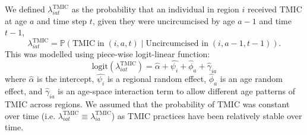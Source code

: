 \documentclass{article}
\begin{document}
\begin{appendix}
\noindent We defined $\lambda^{\text{TMIC}}_{iat}$ as the probability that an individual in region $i$ received TMIC at age $a$ and time step $t$, given they were uncircumcised by age $a-1$ and time $t-1$, 
\begin{equation} 
		\lambda^{\text{TMIC}}_{iat} = \mathbb{P}(\text{TMIC} \; \text{in} \; (i,a,t) \; | \; \text{Uncircumcised in} \; (i,a-1, t-1)). 
	\label{eqn::tmic}
\end{equation}
This was modelled using piece-wise logit-linear function:
\begin{equation*} 
	\text{logit}(\lambda^{\text{TMIC}}_{iat}) = \hat{\alpha} + \hat{\psi_i} + \hat{\phi}_a + \hat{\gamma}_{ia}
\end{equation*}
where $\hat{\alpha}$ is the intercept, $\hat{\psi_i}$ is a regional random effect, $\hat{\phi}_a$ is an age random effect, and $\hat{\gamma}_{ia}$ is an age-space interaction term to allow different age patterns of TMIC  across regions. We assumed that the probability of TMIC was constant over time (i.e. $\lambda^{\text{TMIC}}_{iat} \equiv \lambda^{\text{TMIC}}_{ia}$) as TMIC practices have been relatively stable over time. \\


\end{appendix}
\end{document}
